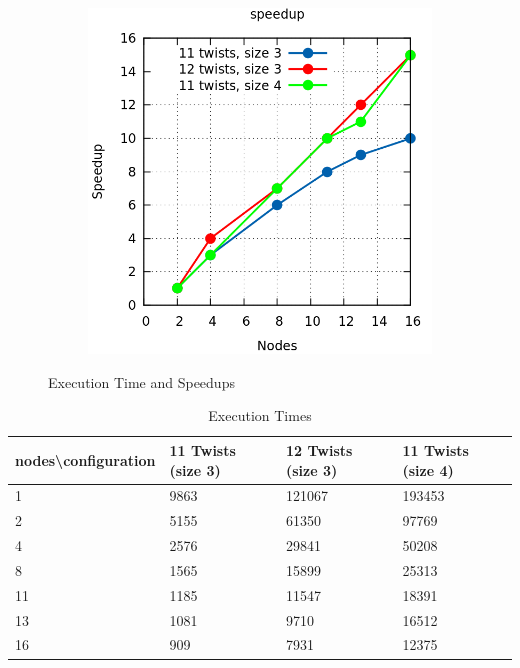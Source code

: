 \documentclass[a4paper]{article}
\begin{document}
\begin{figure}[!ht]
\begin{subfigure}{0.5\textwidth}
\end{subfigure}
\begin{subfigure}{0.5\textwidth}
\centering
\includegraphics[width=\linewidth]{results/speedups_cube}
\end{subfigure}
\caption{Execution Time and Speedups}
 \label{fig:speed}
\end{figure}
\FloatBarrier

\begin{table}[!ht]
\centering
  \begin{tabular}{l|l|l|l}
  
\multicolumn{1}{c}{\bfseries nodes\textbackslash configuration} & 11 Twists (size 3) & 12 Twists (size 3) & 11 Twists (size 4) \\ \hline
1 & 9863 & 121067 & 193453 \\ \hline
2 & 5155 & 61350 & 97769 \\ \hline
4 & 2576 & 29841 & 50208 \\ \hline
8 & 1565 &  15899 & 25313 \\ \hline
11 & 1185 & 11547 & 18391 \\ \hline
13 & 1081 & 9710 & 16512 \\ \hline
16 & 909 & 7931 &  12375	
  \end{tabular}
  \caption{Execution Times}
  \label{tab:exe_all}
\end{table}
  
\end{document}

